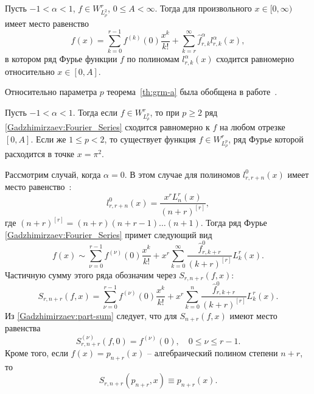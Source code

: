 \begin{theoremA}\label{th:grm-a}
	Пусть $-1<\alpha<1$, $f\in W^r_{L^2_\rho}$, $0\le A<\infty$. Тогда для произвольного $x\in [0,\infty)$ имеет место равенство
	\begin{equation*}
	f(x) = \sum_{k=0}^{r-1}f^{(k)}(0)\frac{x^k}{k!}+\sum_{k=r}^{\infty} \hat{f}_{r,k}^\alpha l_{r,k}^\alpha(x),
	\end{equation*}
	в котором ряд Фурье функции $f$ по полиномам $l_{r,k}^{\alpha}(x)$ сходится равномерно относительно $x\in[0,A]$.
\end{theoremA}

Относительно параметра $p$ теорема~\ref{th:grm-a} была обобщена в работе~\cite{Gadzhimirzaev:RamIzv2020}.

\begin{theoremA}
	Пусть $-1<\alpha<1$. Тогда если $f\in W^r_{L^p_\rho}$, то при $p\ge2$ ряд \eqref{Gadzhimirzaev:Fourier_Series} сходится равномерно к $f$ на любом отрезке $[0,A]$. Если же $1\le p<2$, то существует функция $f\in W^r_{L^p_\rho}$, ряд Фурье которой расходится в точке $x=\pi^2$.
\end{theoremA}

Рассмотрим случай, когда $\alpha=0$. В этом случае для полиномов $l_{r,r+n}^{0}(x)$ имеет место равенство~\cite[следствие 3.1]{Gadzhimirzaev:ShII-MMG}:
\begin{equation*}
l_{r,r+n}^{0}(x)=\frac{x^r L_n^r(x)}{(n+r)^{[r]}},
\end{equation*}
где $(n+r)^{[r]}=(n+r)(n+r-1)\ldots(n+1)$.
Тогда ряд Фурье \eqref{Gadzhimirzaev:Fourier_Series} примет следующий вид
\begin{equation*}
f(x)\sim \sum_{\nu=0}^{r-1}f^{(\nu)}(0)\frac{x^k}{k!}+x^r\sum_{k=0}^{\infty} \frac{\hat{f}_{r,k+r}^0}{(k+r)^{[r]}}L_k^r(x).
\end{equation*}
Частичную сумму этого ряда обозначим через $S_{r,n+r}(f,x)$:
\begin{equation}\label{Gadzhimirzaev:part-sum}
S_{r,n+r}(f,x)=\sum_{\nu=0}^{r-1}f^{(\nu)}(0)\frac{x^k}{k!}+x^r\sum_{k=0}^{n} \frac{\hat{f}_{r,k+r}^0}{(k+r)^{[r]}}L_k^r(x).
\end{equation}
Из \eqref{Gadzhimirzaev:part-sum} следует, что для $S_{n+r}(f,x)$ имеют место равенства
\begin{equation*}
S_{r,n+r}^{(\nu)}(f,0)=f^{(\nu)}(0), \quad 0\le\nu\le r-1.
\end{equation*}
Кроме того, если $f(x)=p_{n+r}(x)$ -- алгебраический полином степени $n+r$, то
\begin{equation}\label{Gadzhimirzaev:part-sum-second-prop}
S_{r,n+r}(p_{n+r},x)\equiv p_{n+r}(x).
\end{equation}

